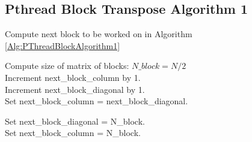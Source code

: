 \documentclass[10pt, onecolumn]{article}
\begin{document}
\subsection{Pthread Block Transpose Algorithm 1}
%
\begin{algorithm}[H]
   \label{Alg:computeNextBlock}
   \caption{Compute next block to be worked on in Algorithm \ref{Alg:PThreadBlockAlgorithm1}}
   Compute size of matrix of blocks: $N\_block = N/2$\\
   Increment next\_block\_column by 1. \\
   {
        Increment next\_block\_diagonal by 1.\\
        Set next\_block\_column = next\_block\_diagonal.
   }
   
   {
        Set next\_block\_diagonal = N\_block. \\
        Set next\_block\_column = N\_block.
   }
   \Return
\end{algorithm}
%
\end{document}
